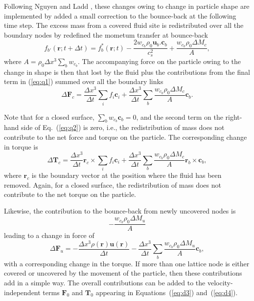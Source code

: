Following Nguyen and Ladd \cite{nl02}, these changes owing
to change in particle shape are implemented by added a small
correction to the bounce-back at the following time step.
The excess mass from a covered fluid site is redistributed over all the
boundary nodes by redefined the mometum transfer at bounce-back
\begin{equation}
f_{b'}(\mathbf{r}; t + \Delta t) = f_b^\ast (\mathbf{r}; t)
- \frac{2 w_{c_b} \rho_0 \mathbf{u}_b . \mathbf{c}_b}{c_s^2}
+ \frac{w_{c_b} \rho_0\Delta M_c }{A},
\label{eq:q1}
\end{equation}
where $A = \rho_0 \Delta x^3 \sum_b w_{c_b}$. The accompanying
force on the particle owing to the change in shape is then
that lost by the fluid plus the contributions from the final term
in (\ref{eq:q1}) summed over all the boundary links
\begin{equation}
\Delta \mathbf{F}_c = \frac{\Delta x^3}{\Delta t}\sum_{i} f_i \mathbf{c}_i
+ \frac{\Delta x^3}{\Delta t} \sum_b \frac{w_{c_b} \rho_0 \Delta M_c}{A}
\mathbf{c}_b.
\label{eq:q2}
\end{equation}

Note that for a closed surface,
$\sum_b w_{c_b}\mathbf{c}_b = 0$, and the second term on the right-hand
side of Eq.~(\ref{eq:q2}) is zero, i.e., the redistribution of mass
does not contribute to the net force and torque on the particle.
The corresponding change in torque is
\begin{equation}
\Delta \mathbf{T}_c = \frac{\Delta x^3}{\Delta t} \mathbf{r}_c
\times \sum_i f_i \mathbf{c}_i
+ \frac{\Delta x^3}{\Delta t}
\sum_b \frac{w_{c_b}\rho_0 \Delta M_c}{A} \mathbf{r}_b \times \mathbf{c}_b,
\label{eq:q2a}
\end{equation}
where $\mathbf{r}_c$ is the boundary vector at the position where the
fluid has been removed. Again, for a closed surface, the
redistribution of mass does not contribute to the net torque
on the particle.

Likewise, the contribution to the bounce-back from newly uncovered nodes
is
\begin{equation}
- \frac{w_{c_b} \rho_0 \Delta M_u}{A}
\label{eq:q3}
\end{equation}
leading to a change in force of
\begin{equation}
\Delta \mathbf{F}_u = -\frac{\Delta x^3 \rho(\mathbf{r})
\mathbf{u}(\mathbf{r})}{\Delta t} - \frac{\Delta x^3}{\Delta t} \sum_b
\frac{w_{c_b} \rho_0 \Delta M_u}{A} \mathbf{c}_b,
\label{eq:q4}
\end{equation}
with a corresponding change in the torque.
If more than one lattice node is either covered or uncovered by
the movement of the particle, then these contributions add in a simple
way. The overall contributions can be added to the
velocity-independent terms $\mathbf{F}_0$ and $\mathbf{T}_0$ appearing in
Equations~(\ref{eq:d3}) and~(\ref{eq:d4}).



